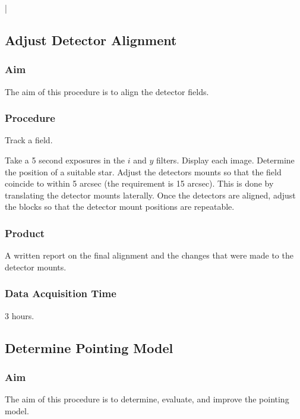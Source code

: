 |\documentclass{article}
\begin{document}
\subsection{Adjust Detector Alignment}

\subsubsection{Aim}

The aim of this procedure is to align the detector fields.

\subsubsection{Procedure}

Track a field. 

Take a 5 second exposures in the $i$ and $y$ filters. Display each image. Determine the position of a suitable star. Adjust the detectors mounts so that the field coincide to within 5 arcsec (the requirement is 15 arcsec). This is done by translating the detector mounts laterally. Once the detectors are aligned, adjust the blocks so that the detector mount positions are repeatable.

\subsubsection{Product}

A written report on the final alignment and the changes that were made to the detector mounts.

\subsubsection{Data Acquisition Time}

3 hours.


\subsection{Determine Pointing Model}

\subsubsection{Aim}

The aim of this procedure is to determine, evaluate, and improve the pointing model.
\end{document}
